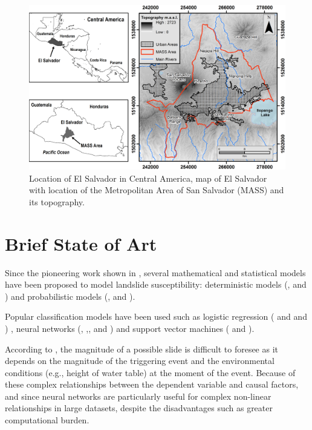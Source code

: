\documentclass[11pt,twoside]{rmta2010esp}%
\begin{document}
 \begin{center}
  \begin{figure}
   \centering
   \includegraphics[scale=0.70]{MASS_mapa_1}
   \caption{\small{Location of El Salvador in Central America, map of El Salvador with location of the Metropolitan Area of San Salvador (MASS) and its topography.}}
   \label{fig:mass01}
  \end{figure}
 \end{center}




\section{Brief State of Art}
\label{sec:brief}
Since the pioneering work shown in \cite{Carrara1983403}, several mathematical and statistical models have been proposed to model landslide susceptibility: deterministic models (\cite{hessd-10-12643-2013},  \cite{doi:10.1080/19475705.2010.498151} and \cite{Neu2012511}) and probabilistic models (\cite{Bern198839}, \cite{Chung2003451} and \cite{doi:10.1080/01431160310001618734} ). 

Popular classification models have been used such as logistic regression (\cite{akgun2012} and \cite{gaskill} and \cite{garcia2008}) , neural networks (\cite{garcia2010}, \cite{Melchiorre2011410},\cite{Zeng2001374}, \cite{Ermini2005327} and \cite{Yesilnacar2005251})  and support vector machines (\cite{ballabio2012support} and \cite{tien2012landslide}). 


According to \cite{van2006landslide}, the magnitude of a possible
slide is difficult to foresee as it depends on the magnitude of the triggering event and the environmental conditions (e.g., height of water table) at the moment of the event. Because of these complex relationships between the dependent variable and causal factors, and since neural networks are particularly useful for complex non-linear relationships in large datasets, despite the disadvantages such as greater computational burden.  
\end{document}

